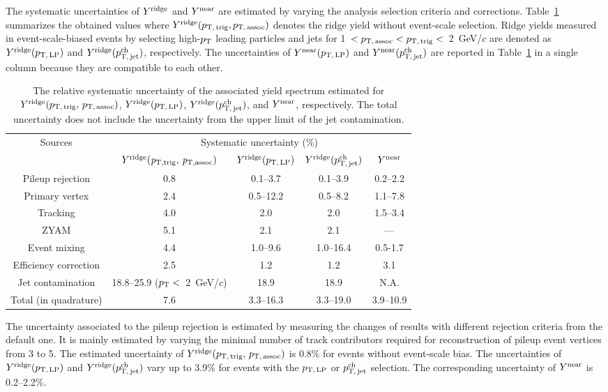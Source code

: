 The systematic uncertainties of $Y^{\rm{ridge}}$ and $Y^{\rm{near}}$ are estimated by varying the analysis selection criteria and corrections. Table~\ref{tab:syst} summarizes the obtained values where $Y^{\rm{ridge}}(p_\mathrm{T,\,trig}, p_\mathrm{T,\,assoc})$ denotes the ridge yield without event-scale selection. Ridge yields measured in event-scale-biased events by selecting high-$p_\mathrm{T}$ leading particles and jets for 1~$<p_\mathrm{T,\,assoc}<p_\mathrm{T,\,trig}<$~2~GeV/$c$ are denoted as $Y^{\rm{ridge}}(p_\mathrm{T,\,LP})$ and $Y^{\rm{ridge}}(p_\mathrm{T,\,jet}^\mathrm{ch})$, respectively. The uncertainties of $Y^{\rm{near}}(p_\mathrm{T,\,LP})$ and $Y^{\rm{near}}(p_\mathrm{T,\,jet}^\mathrm{ch})$ are reported in Table~\ref{tab:syst} in a single column because they are compatible to each other.

\begin{table}[h!]
\caption{The relative systematic uncertainty of the associated yield spectrum estimated for $Y^{\rm{ridge}}(p_\mathrm{T,\,trig},\,p_\mathrm{T,\,assoc})$, $Y^{\rm{ridge}}(p_\mathrm{T,\,LP})$, $Y^{\rm{ridge}}(p_\mathrm{T,\,jet}^\mathrm{ch})$, and $Y^{\rm{near}}$, respectively. The total uncertainty does not include the uncertainty from the upper limit of the jet contamination. }
\centering
\begin{tabular}{c|c|c|c|c}
\hline 
\multirow{2}{*}{Sources}  & \multicolumn{4}{c}{Systematic uncertainty (\%)} \\\cline{2-5} 
         & $Y^{\rm{ridge}}(\it{p}_{\rm{T, trig}},\,\it{p}_{\rm{T, assoc}})$ & $Y^{\rm{ridge}}(p_\mathrm{T,\,LP})$ & $Y^{\rm{ridge}}(p_\mathrm{T,\,jet}^\mathrm{ch})$ & $Y^{\rm{near}}$ \\ \hline 
Pileup rejection		& 0.8	&0.1--3.7		&0.1--3.9	&0.2--2.2	\\ 
Primary vertex		& 2.4	&0.5--12.2	&0.5--8.2	&1.1--7.8	\\ 

Tracking			& 4.0 	&2.0		&2.0	&1.5--3.4	\\ 

ZYAM			& 5.1	&2.1		&2.1	&---	\\ 
Event mixing			& 4.4	&1.0--9.6		&1.0--16.4	&0.5-1.7	\\ 

Efficiency correction	& 2.5 	&1.2		&1.2	&3.1	\\  
Jet contamination	& 18.8--25.9 ($p_\mathrm{T}<$~2~GeV/$c$)	& 18.9		&18.9	&N.A.	\\ \hline 
Total (in quadrature)			& 7.6	&3.3--16.3	&3.3--19.0	&3.9--10.9 \\ 
\hline 
\end{tabular}
\label{tab:syst}
\end{table}

The uncertainty associated to the pileup rejection is estimated by measuring the changes of results with different rejection criteria from the default one. It is mainly estimated by varying the minimal number of track contributors required for reconstruction of pileup event vertices from 3 to 5. The estimated uncertainty of $Y^{\rm{ridge}}(p_\mathrm{T,\,trig},\,p_\mathrm{T,\,assoc})$ is 0.8\% for events without event-scale bias. The uncertainties of $Y^{\rm{ridge}}(p_\mathrm{T,\,LP})$ and $Y^{\rm{ridge}}(p_\mathrm{T,\,jet}^\mathrm{ch})$ vary up to 3.9\% for events with the $p_\mathrm{T,\,LP}$ or $p_\mathrm{T,\,jet}^\mathrm{ch}$ selection. The corresponding uncertainty of $Y^{\rm{near}}$ is 0.2--2.2\%.
 
